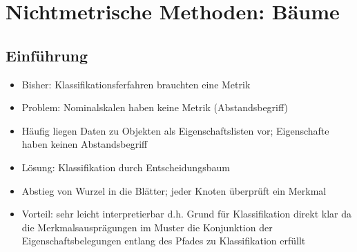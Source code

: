 \documentclass{article} %
\begin{document}
	\section{Nichtmetrische Methoden: Bäume}
	\subsection{Einführung}
	\begin{itemize}
		\item Bisher: Klassifikationsferfahren brauchten eine Metrik
		\item Problem: Nominalskalen haben keine Metrik (Abstandsbegriff)
		\item Häufig liegen Daten zu Objekten als Eigenschaftslisten vor; Eigenschafte haben keinen Abstandsbegriff
		\item Lösung: Klassifikation durch Entscheidungsbaum
		\item Abstieg von Wurzel in die Blätter; jeder Knoten überprüft ein Merkmal
		\item Vorteil: sehr leicht interpretierbar d.h. Grund für Klassifikation direkt klar da die Merkmalsausprägungen im Muster die Konjunktion der Eigenschaftsbelegungen entlang des Pfades zu Klassifikation erfüllt
	\end{itemize}
\end{document}
